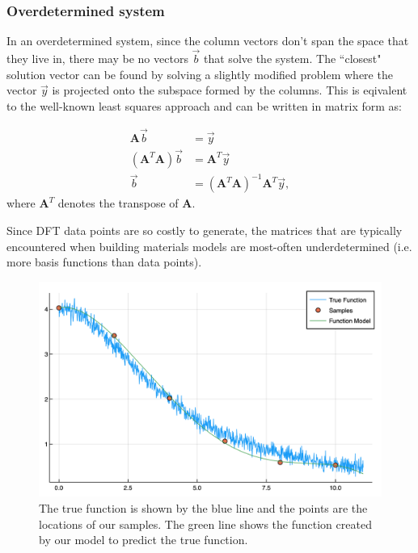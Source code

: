 \subsubsection{Overdetermined system}
In an overdetermined system, since the column vectors don't span the space that they live in, there may be no vectors $\vec{b}$ that solve the system.  The ``closest" solution vector can be found by solving a slightly modified problem where the vector $\vec{y}$ is projected onto the subspace formed by the columns.  This is eqivalent to the well-known least squares approach and can be written in matrix form as:

\begin{align}
\mathbf{A}\vec{b} &= \vec{y} \nonumber \\
(\mathbf{A}^T\mathbf{A})\vec{b} &= \mathbf{A}^T\vec{y} \nonumber \\
\vec{b} &= (\mathbf{A}^T\mathbf{A})^{-1}\mathbf{A}^T\vec{y}, \label{eq:bSolve}
\end{align}
where $\mathbf{A}^T$ denotes the transpose of $\mathbf{A}$.

\par Since DFT data points are so costly to generate, the matrices that are typically encountered when building materials models are most-often underdetermined (i.e. more basis functions than data points).


\begin{figure}[h]
\includegraphics[scale = 0.4]{Figures/func1True}
\caption{The true function is shown by the blue line and the points are the locations of our samples. The green line shows the function created by our model to predict the true function.
\label{fig:func1True}} 
\end{figure}



